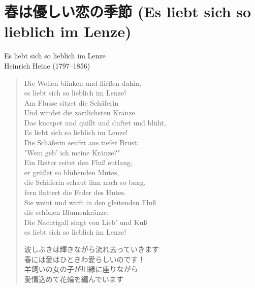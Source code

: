 
\section{春は優しい恋の季節 (Es liebt sich so lieblich im Lenze)}

\vspace*{5truemm}
\begin{center}
	{\large Es liebt sich so lieblich im Lenze}\\
	\hspace*{25truemm}Heinrich Heine (1797--1856)
\end{center}
\begin{quote}
\begin{multicols}{2}
	Die Wellen blinken und flie{\ss}en dahin, \\
	es liebt sich so lieblich im Lenze! \\
	Am Flusse sitzet die Sch{\"a}ferin \\
	Und windet die z\"artlichsten Kr\"anze. \\

	Das knospet und quillt und duftet und bl{\"u}ht, \\
	Es liebt sich so lieblich im Lenze! \\
	Die Sch{\"a}ferin seufzt aus tiefer Brust: \\
	"Wem geb' ich meine Kr{\"a}nze?" \\

	Ein Reiter reitet den Flu{\ss} entlang, \\
	er gr\"u{\ss}et so bl{\"u}henden Mutes, \\
	die Sch{\"a}ferin schaut ihm nach so bang, \\
	fern flattert die Feder des Hutes. \\

	Sie weint und wirft in den gleitenden Flu\ss \\
	die sch{\"o}nen Blumenkr{\"a}nze. \\
	Die Nachtigall singt von Lieb' und Ku\ss \\
	es liebt sich so lieblich im Lenze!

	波しぶきは輝きながら流れ去っていきます \\
	春には愛はひときわ愛らしいのです！ \\
	羊飼いの女の子が川縁に座りながら \\
	愛情込めて花輪を編んでいます \\


\end{multicols}
\end{quote}
